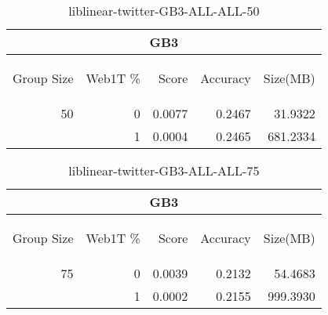 \begin{center}
\begin{table}[htbp]
\begin{tabular}{ | r | r | r | r | r |}
\hline
\multicolumn{5}{|c|}{GB3}\\
\hline
\begin{sideways}Group Size\end{sideways} & \begin{sideways}Web1T \%\end{sideways} & \begin{sideways}Score\end{sideways} & \begin{sideways}Accuracy\end{sideways} & \begin{sideways}Size(MB)\end{sideways}\\
\hline
\multirow{1}{*}{50}
 & 0 & 0.0077 & 0.2467 & 31.9322\\ \cline{2-5}
 & 1 & 0.0004 & 0.2465 & 681.2334\\ \cline{2-5}
\hline
\end{tabular}
\caption{liblinear-twitter-GB3-ALL-ALL-50}
\label{table:liblinear-twitter-GB3-ALL-ALL-50}
\end{table}
\end{center}

\begin{center}
\begin{table}[htbp]
\begin{tabular}{ | r | r | r | r | r |}
\hline
\multicolumn{5}{|c|}{GB3}\\
\hline
\begin{sideways}Group Size\end{sideways} & \begin{sideways}Web1T \%\end{sideways} & \begin{sideways}Score\end{sideways} & \begin{sideways}Accuracy\end{sideways} & \begin{sideways}Size(MB)\end{sideways}\\
\hline
\multirow{1}{*}{75}
 & 0 & 0.0039 & 0.2132 & 54.4683\\ \cline{2-5}
 & 1 & 0.0002 & 0.2155 & 999.3930\\ \cline{2-5}
\hline
\end{tabular}
\caption{liblinear-twitter-GB3-ALL-ALL-75}
\label{table:liblinear-twitter-GB3-ALL-ALL-75}
\end{table}
\end{center}

